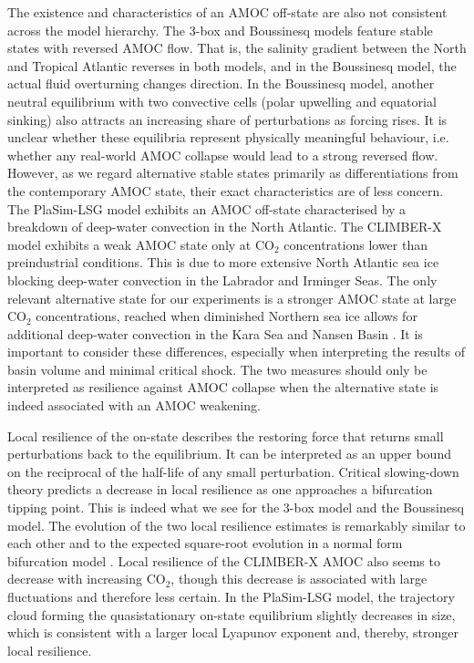 \documentclass[12pt, a4paper]{article}
\newcommand{\CO}{CO\ensuremath{_2}}
\begin{document}
The existence and characteristics of an AMOC off-state are also not consistent across the model hierarchy. The 3-box and Boussinesq models feature stable states with reversed AMOC flow. That is, the salinity gradient between the North and Tropical Atlantic reverses in both models, and in the Boussinesq model, the actual fluid overturning changes direction. In the Boussinesq model, another neutral equilibrium with two convective cells (polar upwelling and equatorial sinking) also attracts an increasing share of perturbations as forcing rises. It is unclear whether these equilibria represent physically meaningful behaviour, i.e. whether any real-world AMOC collapse would lead to a strong reversed flow. However, as we regard alternative stable states primarily as differentiations from the contemporary AMOC state, their exact characteristics are of less concern. The PlaSim-LSG model exhibits an AMOC off-state characterised by a breakdown of deep-water convection in the North Atlantic. The CLIMBER-X model exhibits a weak AMOC state only at \CO{} concentrations lower than preindustrial conditions. This is due to more extensive North Atlantic sea ice blocking deep-water convection in the Labrador and Irminger Seas. The only relevant alternative state for our experiments is a stronger AMOC state at large \CO{} concentrations, reached when diminished Northern sea ice allows for additional deep-water convection in the Kara Sea and Nansen Basin \citep{Willeit2024GeneralizedStabilityLandscape}. It is important to consider these differences, especially when interpreting the results of basin volume and minimal critical shock. The two measures should only be interpreted as resilience against AMOC collapse when the alternative state is indeed associated with an AMOC weakening.

Local resilience of the on-state describes the restoring force that returns small perturbations back to the equilibrium. It can be interpreted as an upper bound on the reciprocal of the half-life of any small perturbation. Critical slowing-down theory predicts a decrease in local resilience as one approaches a bifurcation tipping point. This is indeed what we see for the 3-box model and the Boussinesq model. The evolution of the two local resilience estimates is remarkably similar to each other and to the expected square-root evolution in a normal form bifurcation model \citep{Kuehn2011CSD}. Local resilience of the CLIMBER-X AMOC also seems to decrease with increasing \CO{}, though this decrease is associated with large fluctuations and therefore less certain. In the PlaSim-LSG model, the trajectory cloud forming the quasistationary on-state equilibrium slightly decreases in size, which is consistent with a larger local Lyapunov exponent and, thereby, stronger local resilience.
\end{document}
